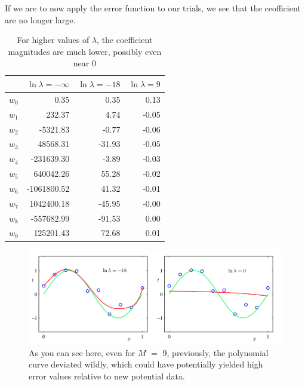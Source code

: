 \documentclass{tufte-handout}
\begin{document}
If we are to now apply the error function to our trials, we see that the
ceofficient are no longer large.

\begin{table}[h]
  \begin{center}
    \begin{tabular}{lrrr}
      \toprule
       & $\ln\lambda = -\infty$ & $\ln\lambda = -18$ & $\ln\lambda = 9$ \\
      \midrule
      $w_0$ &        0.35 &   0.35 &  0.13 \\
      $w_1$ &      232.37 &   4.74 & -0.05 \\
      $w_2$ &    -5321.83 &  -0.77 & -0.06 \\
      $w_3$ &    48568.31 & -31.93 & -0.05 \\
      $w_4$ &  -231639.30 &  -3.89 & -0.03 \\
      $w_5$ &   640042.26 &  55.28 & -0.02 \\
      $w_6$ & -1061800.52 &  41.32 & -0.01 \\
      $w_7$ &  1042400.18 & -45.95 & -0.00 \\
      $w_8$ &  -557682.99 & -91.53 &  0.00 \\
      $w_9$ &   125201.43 &  72.68 &  0.01 \\
      \bottomrule
    \end{tabular}
  \end{center}
  \caption{For higher values of $\lambda$, the coefficient magnitudes are much
    lower, possibly even near $0$}
  \label{tab:font-sizes}
\end{table}

\begin{figure}[h] \label{}
  \includegraphics[width=\linewidth]{lambda.png}
  \caption{As you can see here, even for $M$ $=$ $9$,
  previously, the polynomial curve deviated wildly, which could have
  potentially yielded high error values relative to new potential data.}
\end{figure}
\end{document}
